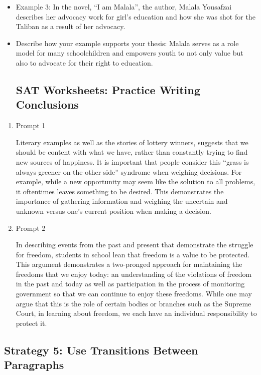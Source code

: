 \begin{enumerate}
\begin{enumerate}
\begin{itemize}
\item Example 3: In the novel, ``I am Malala'', the author, Malala Yousafzai describes her advocacy work for girl’s education and how she was shot for the Taliban as a result of her advocacy. 
\item Describe how your example supports your thesis: Malala serves as a role model for many schoolchildren and empowers youth to not only value but also to advocate for their right to education. 
\subsection{SAT Worksheets: Practice Writing Conclusions}

\end{itemize}
\end{enumerate}

\begin{enumerate}

\item Prompt 1

\bigskip
Literary examples as well as the stories of lottery winners, suggests that we should be content with what we have, rather than constantly trying to find new sources of happiness. It is important that people consider this ``grass is always greener on the other side'' syndrome when weighing decisions. For example, while a new opportunity may seem like the solution to all problems, it oftentimes leaves something to be desired. This demonstrates the importance of gathering information and weighing the uncertain and unknown versus one’s current position when making a decision. 

\item Prompt 2

\bigskip
In describing events from the past and present that demonstrate the struggle for freedom, students in school lean that freedom is a value to be protected. This argument demonstrates a two-pronged approach for maintaining the freedoms that we enjoy today: an understanding of the violations of freedom in the past and today as well as participation in the process of monitoring government so that we can continue to enjoy these freedoms. While one may argue that this is the role of certain bodies or branches such as the Supreme Court, in learning about freedom, we each have an individual responsibility to protect it. 

\end{enumerate} 

\subsection{Strategy 5: Use Transitions Between Paragraphs}


\end{enumerate}
